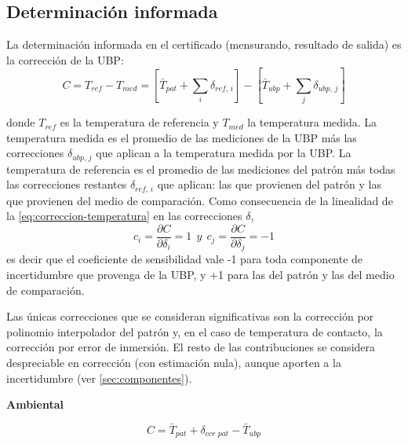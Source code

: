 
\subsection{Determinación informada}\label{sec:determinacion-informada}

La determinación informada en el certificado (mensurando, resultado de salida) es la corrección de la UBP:
\begin{equation}
    C = T_{ref} - T_{med} = \left[\bar{T}_{pat} + \sum_i \delta_{\textit{ref, i}}\right]-\left[\bar{T}_{ubp} + \sum_j \delta_{\textit{ubp, j}}\right]
    \label{eq:correccion-temperatura}
\end{equation}


donde $T_{ref}$ es la temperatura de referencia y $T_{med}$ la temperatura medida. La temperatura medida es el promedio de las mediciones de la UBP más las correcciones $\delta_{\textit{ubp, j}}$ que aplican a la temperatura medida por la UBP. La temperatura de referencia es el promedio de las mediciones del patrón más todas las correcciones restantes $\delta_{\textit{ref, i}}$ que aplican: las que provienen del patrón y las que provienen del medio de comparación. Como consecuencia de la linealidad de la \cref{eq:correccion-temperatura} en las correcciones $\delta$,
\begin{equation}
    c_i = \frac{\partial C}{\partial \delta_i} = 1 \ \ y \ \ c_j = \frac{\partial C}{\partial \delta_j} = -1      
\end{equation}
es decir que el coeficiente de sensibilidad vale -1 para toda componente de incertidumbre que provenga de la UBP, y +1 para las del patrón y las del medio de comparación.

Las únicas correcciones que se consideran significativas son la corrección por polinomio interpolador del patrón y, en el caso de temperatura de contacto, la corrección por error de inmersión. El resto de las contribuciones se considera despreciable en corrección (con estimación nula), aunque aporten a la incertidumbre (ver \cref{sec:componentes}).

\textbf{Ambiental}

\begin{equation}
    C = \bar{T}_{pat} + \delta_{\textit{ccr pat}} - \bar{T}_{ubp}    
\end{equation}

